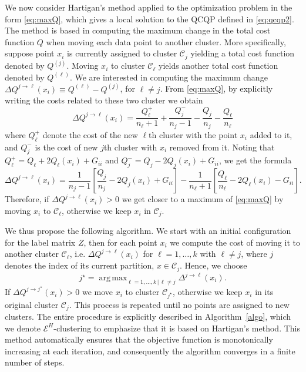 \documentclass[aps,preprint,nofootinbib,floatfix]{revtex4-1}
\DeclareMathOperator*{\argmax}{arg\,max}
\newcommand\C{{\mathcal{C}}}
\begin{document}
We now consider Hartigan's method \cite{Hartigan} 
applied to the optimization problem in the form \eqref{eq:maxQ}, which gives
a local solution to the QCQP defined in \eqref{eq:qcqp2}. 
The method is based in computing the maximum change
in the total cost function $Q$ when moving each data point to
another cluster. More specifically, 
suppose point $x_i$
is currently assigned to  cluster $\C_j$ yielding
a total cost function denoted by $Q^{(j)}$.
Moving $x_i$ to cluster $\C_\ell$ yields another total cost function
denoted by $Q^{(\ell)}$. We are interested in computing the maximum 
change
$\Delta Q^{j\to \ell} (x_i) \equiv Q^{(\ell)} - Q^{(j)}$, for $\ell\ne j$. 
From \eqref{eq:maxQ}, by explicitly writing the costs related to these 
two cluster we obtain
\begin{equation}
\Delta Q^{j\to \ell} (x_i) = \dfrac{Q_\ell^{+}}{n_\ell+1} + 
\dfrac{Q_j^-}{n_j-1} - \dfrac{Q_j}{n_j} - \dfrac{Q_\ell}{n_\ell}
\end{equation}
where $Q^{+}_\ell$ denote the cost of the new $\ell$th cluster
with the point $x_i$ added to it, and $Q^-_j$ is the cost of new 
$j$th cluster with $x_i$ removed from it. Noting that 
$Q_\ell^{+} = Q_\ell + 2 Q_\ell(x_i) + G_{ii}$ and
$Q_j^{-} = Q_j - 2 Q_j(x_i) + G_{ii}$, we get the formula
\begin{equation}
\label{eq:changeQ}
\Delta Q^{j \to \ell}(x_i)  = 
\dfrac{1}{n_j - 1}\left[ \dfrac{Q_j}{n_j} - 2 Q_j(x_i) + G_{ii} \right]
- \dfrac{1}{n_\ell + 1}\left[ \dfrac{Q_\ell}{n_\ell} - 2 Q_\ell(x_i) 
- G_{ii} \right].
\end{equation}
Therefore, if $\Delta Q^{j\to \ell}(x_i) > 0$ we get closer to a 
maximum of \eqref{eq:maxQ} by
moving $x_i$ to $\C_\ell$, otherwise we keep $x_i$ in $\C_j$. 

We thus propose the following algorithm.
We start with an initial configuration for the label matrix $Z$, 
then for each
point $x_i$ 
we compute the cost of moving it to another cluster $\C_\ell$, i.e.
$\Delta Q^{j\to \ell}(x_i)$ for 
$\ell=1,\dots,k$ with $\ell \ne j$, where $j$ denotes the index of its current
partition, $x \in \C_j$. Hence, we choose
\begin{equation}
j^\star = \argmax_{\ell=1,\dotsc,k \, | \, \ell\ne j} 
\Delta^{j \to \ell}(x_i).
\end{equation}
If $\Delta Q^{j \to j^\star}(x_i) > 0$ 
we move $x_i$ to cluster $\C_{j^\star}$, otherwise 
we keep $x_i$ in its original cluster $\C_j$. 
This process is repeated
until no points are assigned to new clusters. 
The entire procedure is explicitly described in Algorithm~\ref{algo}, which we
denote $\mathcal{E}^H$-clustering to emphasize that it is based on
Hartigan's method.
This method automatically ensures that the objective function is
monotonically increasing at each iteration, and consequently the algorithm
converges in a finite number of steps.
\end{document}
